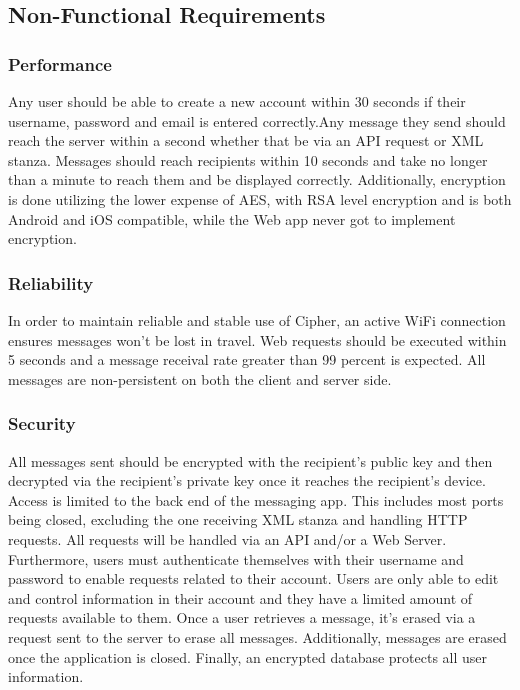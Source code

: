\documentclass[12pt]{article}
\begin{document}
\subsection{Non-Functional Requirements}

\subsubsection{Performance}
Any user should be able to create a new account within 30 seconds if their username, password and email is entered correctly.Any message they send should reach the server within a second whether that be via an API request or XML stanza. Messages should reach recipients within 10 seconds and take no longer than a minute to reach them and be displayed correctly. Additionally, encryption is done utilizing the lower expense of AES, with RSA level encryption and is both Android and iOS compatible, while the Web app never got to implement encryption.

\subsubsection{Reliability}
In order to maintain reliable and stable use of Cipher, an active WiFi connection ensures messages won't be lost in travel. Web requests should be executed within 5 seconds and a message receival rate greater than 99 percent is expected. All messages are non-persistent on both the client and server side. 


\subsubsection{Security}
All messages sent should be encrypted with the recipient's public key and then decrypted via the recipient’s private key once it reaches the recipient’s device. Access is limited to the back end of the messaging app. This includes most ports being closed, excluding the one receiving XML stanza and handling HTTP requests. All requests will be handled via an API and/or a Web Server. Furthermore, users must authenticate themselves with their username and password to enable requests related to their account. Users are only able to edit and control information in their account and they have a limited amount of requests available to them. Once a user retrieves a message, it's erased via a request sent to the server to erase all messages. Additionally, messages are erased once the application is closed. Finally, an encrypted database protects all user information.
\end{document}
